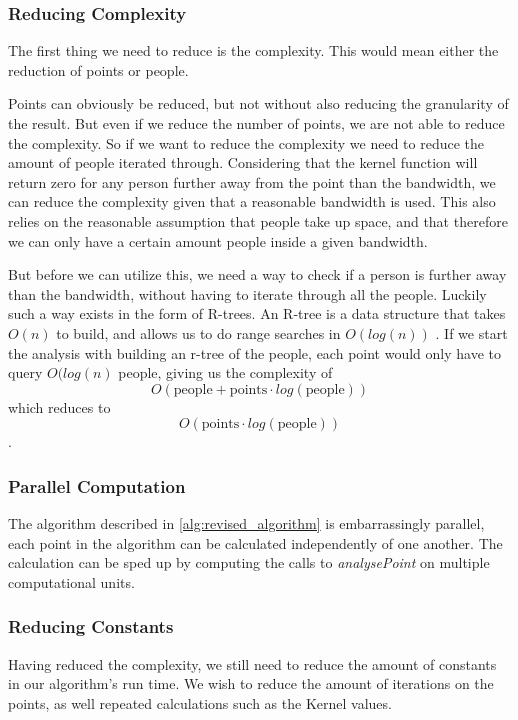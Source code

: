 \subsubsection{Reducing Complexity}

The first thing we need to reduce is the complexity. This would mean either the reduction of points or people.

Points can obviously be reduced, but not without also reducing the granularity of the result. But even if we reduce the number of points, we are not able to reduce the complexity. So if we want to reduce the complexity we need to reduce the amount of people iterated through. Considering that the kernel function will return zero for any person further away from the point than the bandwidth, we can reduce the complexity given that a reasonable bandwidth is used. This also relies on the reasonable assumption that people take up space, and that therefore we can only have a certain amount people inside a given bandwidth.

But before we can utilize this, we need a way to check if a person is further away than the bandwidth, without having to iterate through all the people. Luckily such a way exists in the form of R-trees. An R-tree is a data structure that takes $O(n)$ to build, and allows us to do range searches in $O(log(n))$ \cite{rtree}. If we start the analysis with building an r-tree of the people, each point would only have to query $O(log(n)$ people, giving us the complexity of $$O(\text{people} + \text{points} \cdot log(\text{people}))$$ which reduces to $$O(\text{points} \cdot log(\text{people}))$$.


\subsubsection{Parallel Computation}
The algorithm described in \cref{alg:revised_algorithm} is embarrassingly parallel, each point in the algorithm can be calculated independently of one another. The calculation can be sped up by computing the calls to \emph{analysePoint} on multiple computational units.

\subsubsection{Reducing Constants}

Having reduced the complexity, we still need to reduce the amount of constants in our algorithm's run time. We wish to reduce the amount of iterations on the points, as well repeated calculations such as the Kernel values.

